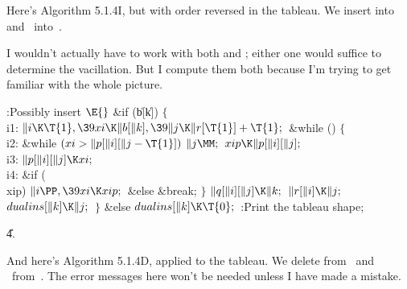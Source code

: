 Here's Algorithm 5.1.4I, but with order reversed in the  tableau.
We insert  into~ and ~into~.

I wouldn't actually have to work with both  and ; either one
would
suffice to determine the vacillation. But I compute them both because
I'm trying to get familiar with the whole picture.

\Y\B\4:Possibly insert \X${}\E{}$\6
\&{if} (\|b[\|k])\5
${}\{{}$\1\6
\4\\{i1}:\5
${}\|i\K\T{1},\39\\{xi}\K\|b[\|k],\39\|j\K\|r[\T{1}]+\T{1};{}$\6
\&{while} ()\5
${}\{{}$\1\6
\4\\{i2}:\5
\&{while} ${}(\\{xi}>\|p[\|i][\|j-\T{1}]){}$\1\5
${}\|j\MM;{}$\2\6
${}\\{xip}\K\|p[\|i][\|j];{}$\6
\4\\{i3}:\5
${}\|p[\|i][\|j]\K\\{xi};{}$\6
\4\\{i4}:\5
\&{if} (\\{xip})\1\5
${}\|i\PP,\39\\{xi}\K\\{xip};{}$\2\6
\&{else}\1\5
\&{break};\2\6
\4${}\}{}$\2\6
${}\|q[\|i][\|j]\K\|k;{}$\6
${}\|r[\|i]\K\|j;{}$\6
${}\\{dualins}[\|k]\K\|j;{}$\6
\4${}\}{}$\5
\2\&{else}\1\5
${}\\{dualins}[\|k]\K\T{0};{}$\2\6
:Print the tableau shape\X;\par
\U4.\fi

And here's Algorithm 5.1.4D, applied to the  tableau.
We delete  from~ and ~from~. The error
messages
here won't be needed unless I have made a mistake.

